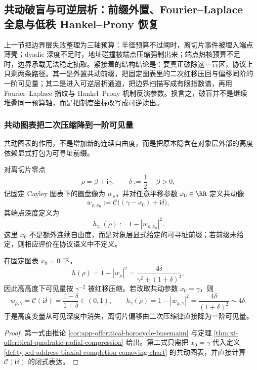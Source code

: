 \subsection{共动破盲与可逆层析：前缀外置、Fourier--Laplace 全息与低秩 Hankel--Prony 恢复}\label{subsec:typed-address-biaxial-completion-comoving-tomography}
上一节把边界层失败整理为三轴预算：半径预算不过阈时，离切片事件被埋入端点薄壳；dyadic 深度不足时，地址碰撞被端点压缩强制出来；端点热核预算不足时，边界承载无法稳定抽取。紧接着的结构结论是：要真正破除这一盲区，协议上只剩两条路径。其一是外置共动前缀，把固定图表里的二次红移压回与偏移同阶的一阶可见量；其二是进入可逆层析通道，把边界扫描写成有限指数谱，再用 Fourier--Laplace 指纹与 Hankel--Prony 机制反演参数。换言之，破盲并不是继续堆叠同一预算轴，而是把制度坐标改写成可逆读出。

\subsubsection{共动图表把二次压缩降到一阶可见量}\label{subsubsec:typed-address-biaxial-completion-comoving-chart}
共动图表的作用，不是增加新的连续自由度，而是把原本隐含在对象层外部的高度依赖显式打包为可寻址前缀。

\begin{definition}[共动视界图表]\label{def:typed-address-biaxial-completion-comoving-chart}
对离切片零点
\[
\rho=\beta+\mathrm{i}\gamma,
\qquad
\delta:=\frac12-\beta>0,
\]
记固定 Cayley 图表下的圆盘像为 \(w_{\rho}\)，并对任意平移参数 \(x_0\in\RR\) 定义共动像
\[
w_{\rho,x_0}:=\mathcal{C}\bigl((\gamma-x_0)+\mathrm{i}\delta\bigr),
\]
其端点深度定义为
\[
h_{x_0}(\rho):=1-|w_{\rho,x_0}|^2.
\]
这里 \(x_0\) 不是额外连续自由度，而是对象层显式给定的可寻址前缀；若前缀未给定，则相应评价在协议语义中不定义。
\end{definition}

\begin{proposition}[固定图表的二次压缩与共动图表的一阶显影]\label{prop:typed-address-biaxial-completion-comoving-first-order}
在固定图表 \(x_0=0\) 下，
\[
h(\rho)=1-|w_\rho|^2=\frac{4\delta}{\gamma^2+(1+\delta)^2},
\]
因此高高度下可见量按 \(\gamma^{-2}\) 被红移压缩。若改取共动参数 \(x_0=\gamma\)，则
\[
w_{\rho,\gamma}=\mathcal{C}(\mathrm{i}\delta)=\frac{1-\delta}{1+\delta}\in(0,1),
\qquad
h_{\gamma}(\rho)=1-|w_{\rho,\gamma}|^2=\frac{4\delta}{(1+\delta)^2}\sim 4\delta.
\]
于是高度变量从可见深度中消失，离切片偏移由二次压缩律直接降为一阶可见量。
\end{proposition}
\begin{proof}
第一式由推论 \ref{cor:app-offcritical-horocycle-busemann} 与定理 \ref{thm:xi-offcritical-quadratic-radial-compression} 给出。第二式只需把 \(x_0=\gamma\) 代入定义 \ref{def:typed-address-biaxial-completion-comoving-chart} 的共动图表，并直接计算 \(\mathcal{C}(\mathrm{i}\delta)\) 的闭式表达。
\end{proof}


